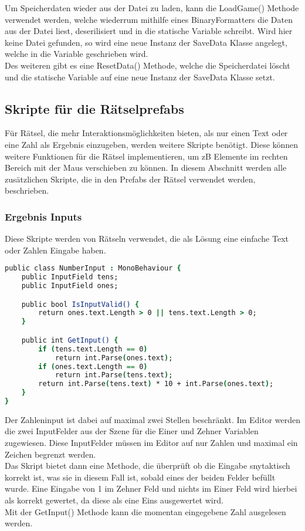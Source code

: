{Um Speicherdaten wieder aus der Datei zu laden, kann die LoadGame() Methode verwendet werden, welche wiederrum mithilfe eines BinaryFormatters die Daten aus der Datei liest, deserilisiert und in die statische Variable schreibt. Wird hier keine Datei gefunden, so wird eine neue Instanz der SaveData Klasse angelegt, welche in die Variable geschrieben wird.\\

Des weiteren gibt es eine ResetData() Methode, welche die Speicherdatei löscht und die statische Variable auf eine neue Instanz der SaveData Klasse setzt.

\subsection{Skripte für die Rätselprefabs}
Für Rätsel, die mehr Interaktionsmöglichkeiten bieten, als nur einen Text oder eine Zahl als Ergebnis einzugeben, werden weitere Skripte benötigt. Diese können weitere Funktionen für die Rätsel implementieren, um zB Elemente im rechten Bereich mit der Maus verschieben zu können. In diesem Abschnitt werden alle zusätzlichen Skripte, die in den Prefabs der Rätsel verwendet werden, beschrieben.

\subsubsection{Ergebnis Inputs}
Diese Skripte werden von Rätseln verwendet, die als Lösung eine einfache Text oder Zahlen Eingabe haben. \\
\begin{lstlisting}[language=csh, caption={Skript für einen zweistelligen Zahlen Input}]
public class NumberInput : MonoBehaviour {
    public InputField tens;
    public InputField ones;

    public bool IsInputValid() {
        return ones.text.Length > 0 || tens.text.Length > 0;
    }

    public int GetInput() {
        if (tens.text.Length == 0)
            return int.Parse(ones.text);
        if (ones.text.Length == 0)
            return int.Parse(tens.text);
        return int.Parse(tens.text) * 10 + int.Parse(ones.text);
    }
}
\end{lstlisting}
Der Zahleninput ist dabei auf maximal zwei Stellen beschränkt. Im Editor werden die zwei InputFelder aus der Szene für die Einer und Zehner Variablen zugewiesen. Diese InputFelder müssen im Editor auf nur Zahlen und maximal ein Zeichen begrenzt werden.\\
Das Skript bietet dann eine Methode, die überprüft ob die Eingabe snytaktisch korrekt ist, was sie in diesem Fall ist, sobald eines der beiden Felder befüllt wurde. Eine Eingabe von 1 im Zehner Feld und nichts im Einer Feld wird hierbei als korrekt gewertet, da diese als eine Eins ausgewertet wird.\\
Mit der GetInput() Methode kann die momentan eingegebene Zahl ausgelesen werden.\\

}
